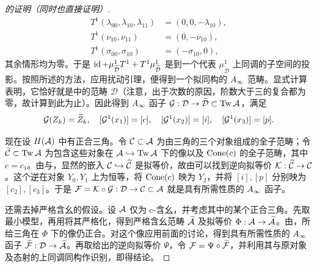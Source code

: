 \begin{proof}[的证明（同时也直接证明）]
\[
\begin{aligned}
T^1(\lambda_{00},\lambda_{10},\lambda_{11})&=(0,0,-\lambda_{10}),\\
T^1(\nu_{10},\nu_{11})&=(0,-\nu_{10}),\\
T^1(\sigma_{00},\sigma_{10})&=(-\sigma_{10},0),
\end{aligned}
\]
其余情形均为零。于是 $\operatorname{id}+\mu^1_{\widetilde{\mathcal D}}T^1+T^1\mu^1_{\widetilde{\mathcal D}}$ 是到一个代表 $\mu^1_{\widetilde{\mathcal D}}$ 上同调的子空间的投影。按照所述的方法，应用扰动引理，便得到一个拟同构的 $A_\infty$ 范畴。显式计算表明，它恰好就是中的范畴 $\mathcal D$（注意，出于次数的原因，阶数大于三的复合都为零，故计算到此为止）。因此得到 $A_\infty$ 函子 $\mathcal G:\mathcal D\to\widetilde{\mathcal D}\subset\operatorname{Tw}\mathcal A$，满足
\[
\mathcal G(Z_k)=\widetilde Z_k,\quad[\mathcal G^1(x_1)]=[c],\quad[\mathcal G^1(x_2)]=[i],\quad[\mathcal G^1(x_3)]=[p].
\]

现在设 $H(\mathcal A)$ 中有正合三角。令 $\mathcal C\subset\mathcal A$ 为由三角的三个对象组成的全子范畴；令 $\widetilde{\mathcal C}\subset\operatorname{Tw}\mathcal A$ 为包含这些对象在 $\mathcal A\hookrightarrow\operatorname{Tw}\mathcal A$ 下的像以及 $\operatorname{Cone}(c)$ 的全子范畴，其中 $c=c_1$。由与，显然的嵌入 $\mathcal C\hookrightarrow\widetilde{\mathcal C}$ 是拟等价，故由可以找到逆向拟等价 $\mathcal K:\widetilde{\mathcal C}\to\mathcal C$。这个逆在对象 $Y_0,Y_1$ 上为恒等，将 $\operatorname{Cone}(c)$ 映为 $Y_2$，并将 $[i],[p]$ 分别映为 $[c_2],[c_3]$。于是 $\mathcal F=\mathcal K\circ\mathcal G:\mathcal D\to\mathcal C\subset\mathcal A$ 就是具有所需性质的 $A_\infty$ 函子。

还需去掉严格含幺的假设。设 $\mathcal A$ 仅为 c-含幺，并考虑其中的某个正合三角。先取最小模型，再用将其严格化，得到严格含幺范畴 $\widetilde{\mathcal A}$ 及拟等价 $\Phi:\mathcal A\to\widetilde{\mathcal A}$。由，所给三角在 $\Phi$ 下的像仍正合。对这个像应用前面的讨论，得到具有所需性质的 $A_\infty$ 函子 $\widetilde{\mathcal F}:\mathcal D\to\widetilde{\mathcal A}$。再取给出的逆向拟等价 $\Psi$，令 $\mathcal F=\Psi\circ\widetilde{\mathcal F}$，并利用其与原对象及态射的上同调同构作识别，即得结论。
\end{proof}

